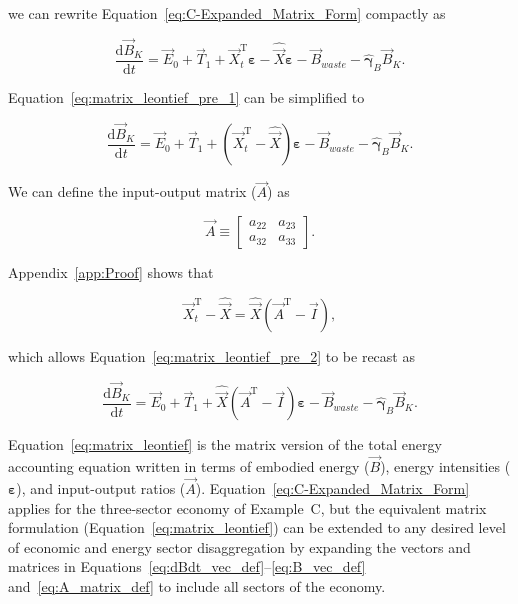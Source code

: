 \noindent{}we can rewrite Equation~\ref{eq:C-Expanded_Matrix_Form}
compactly as

\begin{equation} \label{eq:matrix_leontief_pre_1}
	\frac{\mathrm{d}\vec{B}_{K}}{\mathrm{d}t} 
	= \vec{E}_{0}
	+ \vec{T}_{1}
	+ \vec{X}_{t}^{\mathrm{T}}\boldsymbol{\varepsilon} 
	- \hat{\vec{X}}\boldsymbol{\varepsilon}
	- \vec{B}_{waste}
	- \hat{\boldsymbol{\gamma}}_{B} \vec{B}_{K}.
\end{equation}

\noindent{}Equation~\ref{eq:matrix_leontief_pre_1} can be simplified to

\begin{equation} \label{eq:matrix_leontief_pre_2}
	\frac{\mathrm{d}\vec{B}_{K}}{\mathrm{d}t} 
	= \vec{E}_{0}
	+ \vec{T}_{1}
	+ (\vec{X}_{t}^{\mathrm{T}} - \hat{\vec{X}})\boldsymbol{\varepsilon} 
	- \vec{B}_{waste}
	- \hat{\boldsymbol{\gamma}}_{B}\vec{B}_{K}.
\end{equation}

\noindent{}We can define the input-output matrix ($\vec{A}$) as

\begin{equation} \label{eq:A_matrix_def}
	\vec{A} 
	\equiv
	\begin{bmatrix}
		a_{22} & a_{23}	\\
		a_{32} & a_{33}	
	\end{bmatrix}.
\end{equation} 

\noindent{}Appendix~\ref{app:Proof} shows that

\begin{equation} \label{eq:Xdifference1}
	\vec{X}_{t}^{\mathrm{T}} 
	- \hat{\vec{X}} 
	= \hat{\vec{X}} (\vec{A}^{\mathrm{T}} - \vec{I}),
\end{equation}

\noindent{}which allows Equation~\ref{eq:matrix_leontief_pre_2}
to be recast as

\begin{equation} \label{eq:matrix_leontief}
	\frac{\mathrm{d}\vec{B}_{K}}{\mathrm{d}t} 
	= \vec{E}_{0}
	+ \vec{T}_{1}
	+ \hat{\vec{X}} (\vec{A}^{\mathrm{T}} - \vec{I})\boldsymbol{\varepsilon} 
	- \vec{B}_{waste}
	- \hat{\boldsymbol{\gamma}}_{B}\vec{B}_{K}.
\end{equation}

\noindent{}Equation~\ref{eq:matrix_leontief} is the matrix version 
of the total energy accounting equation
written in terms of embodied energy ($\vec{B}$), 
energy intensities ($\boldsymbol{\varepsilon}$),
and input-output ratios ($\vec{A}$).
Equation~\ref{eq:C-Expanded_Matrix_Form} applies 
for the three-sector economy of Example~C, 
but the equivalent matrix formulation (Equation~\ref{eq:matrix_leontief}) 
can be extended to any desired level 
of economic and energy sector disaggregation 
by expanding the vectors and matrices in 
Equations~\ref{eq:dBdt_vec_def}--\ref{eq:B_vec_def}
and~\ref{eq:A_matrix_def} to include
all sectors of the economy.\cite{Bullard:1978vd,Casler1984}

